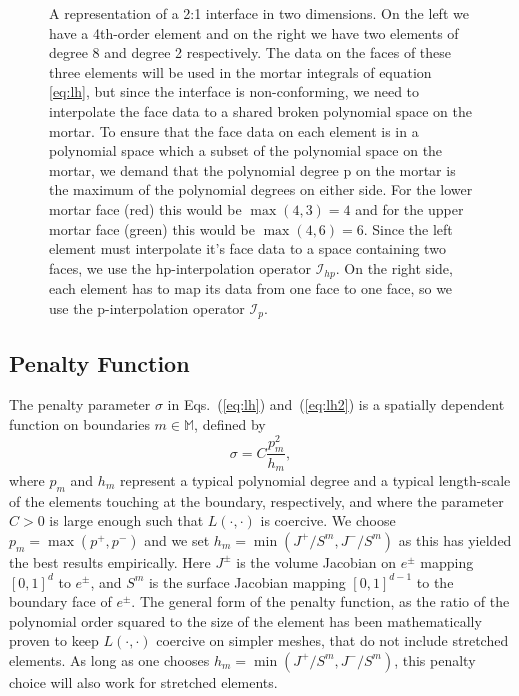 \begin{figure}
\medskip
\caption{A representation of a 2:1 interface in two dimensions. On the
  left we have a 4th-order element and on the right we have two
  elements of degree 8 and degree 2 respectively. The data on the
  faces of these three elements will be used in the mortar integrals
  of equation \ref{eq:lh}, but since the interface is
  non-conforming, we need to interpolate the face data to a shared
  broken polynomial space on the mortar. To ensure that the face data
  on each element is in a polynomial space which a subset of the
  polynomial space on the mortar, we demand that the polynomial degree
  p on the mortar is the maximum of the polynomial degrees on either
  side. For the lower mortar face (red) this would be $\max(4,3) = 4$
  and for the upper mortar face (green) this would be $\max(4,6) = 6$.
  Since the left element must interpolate it's face data to a
  space containing two faces, we use the hp-interpolation operator
  $\mathcal{I}_{hp}$. On the right side, each element has to map its
  data from one face to one face, so we use the p-interpolation
  operator $\mathcal{I}_p$.}
\end{figure}



\subsection{Penalty Function}

The penalty parameter $\sigma$ in Eqs.~(\ref{eq:lh}) and~(\ref{eq:lh2}) is a spatially dependent function on boundaries $m\in\mathbb{M}$, defined by
\begin{equation}
\label{eq:penaltyparameter}
\sigma = C\frac{p_{m}^{2}}{h_{m}},
\end{equation}
where $p_m$ and $h_m$ represent a typical polynomial degree and a typical length-scale of the elements touching at the boundary, respectively,  and where the parameter $C>0$ is large enough such
that $L\left(\cdot, \cdot\right)$ is coercive. We choose $p_{m} = \max(p^+,p^-)$
and we set $h_{m} = \min(J^{+}/S^m,J^{-}/S^m)$ as this has yielded the best results empirically. Here $J^{\pm}$ is the
volume Jacobian on $e^\pm$ mapping $[0,1]^d$ to $e^\pm$, and $S^m$ is the
surface Jacobian mapping $[0,1]^{d-1}$ to the boundary face of $e^\pm$. The general form of the penalty function, as the ratio of the polynomial order squared to the size of the element has been mathematically proven to keep $L\left(\cdot, \cdot\right)$ coercive on simpler meshes, that do not include stretched elements. As long as one chooses $h_{m} = \min(J^{+}/S^m,J^{-}/S^m)$, this penalty choice will also work for stretched elements.
  

